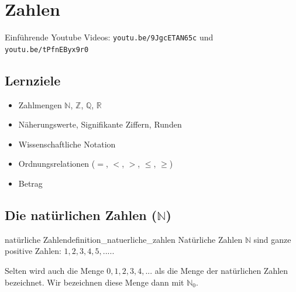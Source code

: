 
\section{Zahlen}

Einführende Youtube Videos: \texttt{youtu.be/9JgcETAN65c} und \texttt{youtu.be/tPfnEByx9r0}

\subsection*{Lernziele}

\begin{itemize}
	\item Zahlmengen $\mathbb{N}$, $\mathbb{Z}$, $\mathbb{Q}$, $\mathbb{R}$
  \item Näherungswerte, Signifikante Ziffern, Runden
  \item Wissenschaftliche Notation
  \item Ordnungsrelationen ($=$, $<$, $>$, $\leq$, $\geq$)
  \item Betrag
\end{itemize}

\subsection{Die natürlichen Zahlen ($\mathbb{N}$)}

\begin{definition}{natürliche Zahlen}{definition_natuerliche_zahlen}
  Natürliche Zahlen $\mathbb{N}$ sind ganze positive Zahlen: ${1, 2, 3, 4, 5, ....}$.
\end{definition}

\begin{bemerkung}{}{}
  Selten wird auch die Menge ${0, 1, 2, 3, 4, ...}$ als die Menge
  der natürlichen Zahlen bezeichnet. Wir bezeichnen diese Menge dann mit $\mathbb{N}_0$.


\end{bemerkung}
\newpage


